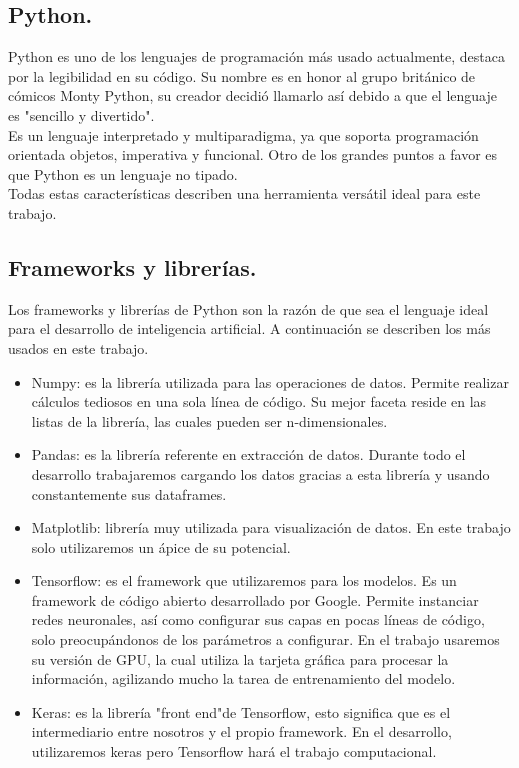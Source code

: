 \documentclass[a4paper,11pt]{article}
\begin{document}
\subsection{Python.}
Python es uno de los lenguajes de programación más usado actualmente, destaca por la legibilidad en su código. Su nombre es en honor al grupo británico de cómicos Monty Python, su creador decidió llamarlo así debido a que el lenguaje es "sencillo y divertido".\\

\noindent
Es un lenguaje interpretado y  multiparadigma, ya que soporta programación orientada objetos, imperativa y funcional. Otro de los grandes puntos a favor es que Python es un lenguaje no tipado.\\

\noindent
Todas estas características describen una herramienta versátil ideal para este trabajo. 
\subsection{Frameworks y librerías.}
Los frameworks y librerías de Python son la razón de que sea el lenguaje ideal para el desarrollo de inteligencia artificial. A continuación se describen los más usados en este trabajo.
\begin{itemize}
\item Numpy: es la librería utilizada para las operaciones de datos. Permite realizar cálculos tediosos en una sola línea de código. Su mejor faceta reside en las listas de la librería, las cuales pueden ser n-dimensionales.
\item Pandas: es la librería referente en extracción de datos. Durante todo el desarrollo trabajaremos cargando los datos gracias a esta librería y usando constantemente sus dataframes.
\item Matplotlib: librería muy utilizada para visualización de datos. En este trabajo solo utilizaremos un ápice de su potencial.
\item Tensorflow: es el framework que utilizaremos para los modelos. Es un framework de código abierto desarrollado por Google. Permite instanciar redes neuronales, así como configurar sus capas en pocas líneas de código, solo preocupándonos de los parámetros a configurar. En el trabajo usaremos su versión de GPU, la cual utiliza la tarjeta gráfica para procesar la información, agilizando mucho la tarea de entrenamiento del modelo.
\item Keras: es la librería "front end"\hspace{0.15cm}de Tensorflow, esto significa que es el intermediario entre nosotros y el propio framework. En el desarrollo, utilizaremos keras pero Tensorflow hará el trabajo  computacional.
\end{itemize}
\end{document}
